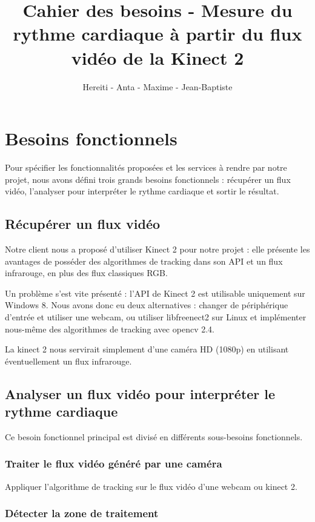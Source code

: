 \documentclass[12pt,a4paper]{article}
\title{Cahier des besoins - Mesure du rythme cardiaque à partir du flux vidéo de la Kinect 2}
\author{Hereiti \bsc{Hatitio} - Anta \bsc{Mbaye} - Maxime \bsc{Vincent} - Jean-Baptiste \bsc{Rey}}
\begin{document}
\maketitle

\tableofcontents
\newpage
\section{Besoins fonctionnels}
Pour spécifier les fonctionnalités proposées et les services à rendre par notre projet, nous avons défini trois grands besoins fonctionnels : récupérer un flux vidéo, l'analyser pour interpréter le rythme cardiaque et sortir le résultat.

\subsection{Récupérer un flux vidéo}
Notre client nous a proposé d'utiliser Kinect 2 pour notre projet : elle présente les avantages de posséder des algorithmes de tracking dans son API et un flux infrarouge, en plus des flux classiques RGB.

Un problème s'est vite présenté : l'API de Kinect 2 est utilisable uniquement sur Windows 8. Nous avons donc eu deux alternatives : changer de périphérique d'entrée et utiliser une webcam, ou utiliser libfreenect2 sur Linux et implémenter nous-même des algorithmes de tracking avec opencv 2.4.

La kinect 2 nous servirait simplement d'une caméra HD (1080p) en utilisant éventuellement un flux infrarouge.

\subsection{Analyser un flux vidéo pour interpréter le rythme cardiaque}
Ce besoin fonctionnel principal est divisé en différents sous-besoins fonctionnels.

\subsubsection{Traiter le flux vidéo généré par une caméra}

Appliquer l'algorithme de tracking sur le flux vidéo d'une webcam ou kinect 2.

\subsubsection{Détecter la zone de traitement}
\end{document}
